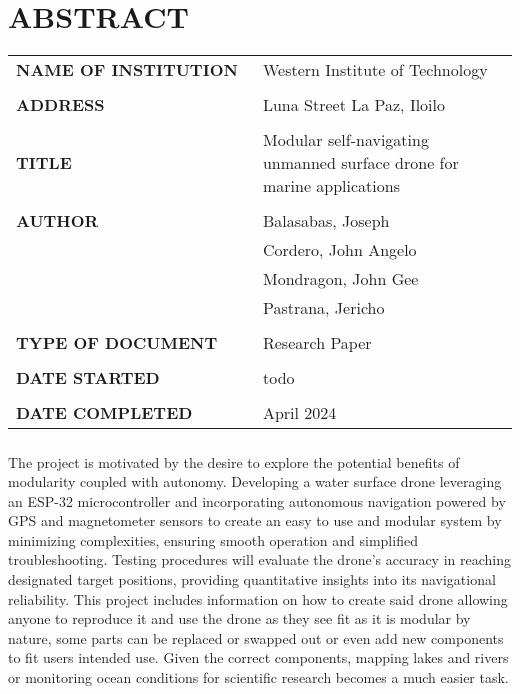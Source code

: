 \setcounter{page}{1}

\chapter*{ABSTRACT}

\vspace{-1cm}
\begin{tabularx}{\linewidth}{@{}p{0.49\linewidth}p{0.51\linewidth}@{}@{}}
\Large {\bf NAME OF INSTITUTION} & \Large Western Institute of Technology \\
\\
\Large {\bf ADDRESS} & \Large Luna Street La Paz, Iloilo \\
\\
\Large{\bf TITLE} & \Large Modular self-navigating unmanned surface drone for marine applications \\
\\
\Large {\bf AUTHOR} & \Large Balasabas, Joseph \\
 & \Large Cordero, John Angelo \\ 
 & \Large Mondragon, John Gee \\
 & \Large Pastrana, Jericho \\
\\
\Large {\bf TYPE OF DOCUMENT} & \Large Research Paper \\
\\
\Large {\bf DATE STARTED} & \Large todo \\
\\
\Large {\bf DATE COMPLETED} & \Large April 2024

\end{tabularx}


\paragraph{} \Large The project is motivated by the desire to explore the potential benefits of modularity coupled with autonomy. Developing a water surface 
            drone leveraging an ESP-32 microcontroller and incorporating autonomous navigation powered by GPS and magnetometer sensors to create an easy
            to use and modular system by minimizing complexities, ensuring smooth operation and simplified troubleshooting. Testing procedures will 
            evaluate the drone's accuracy in reaching designated target positions, providing quantitative insights into its navigational reliability. 
            This project includes information on how to create said drone allowing anyone to reproduce it and use the drone as they see fit as it is 
            modular by nature, some parts can be replaced or swapped out or even add new components to fit users intended use. Given the correct 
            components, mapping lakes and rivers or monitoring ocean conditions for scientific research becomes a much easier task.